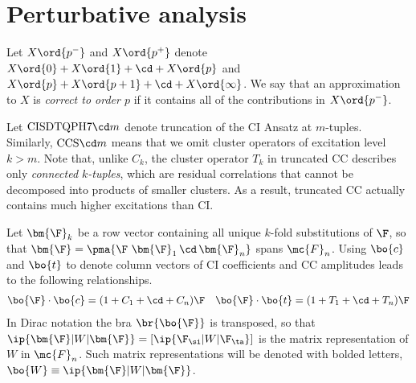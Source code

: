 \chapter{Perturbative analysis}


\begin{dfn}
Let
$
  X\ord{p^-}
$
and
$
  X\ord{p^+}
$
denote
$
  X\ord{0}
+
  X\ord{1}
+
  \cd
+
  X\ord{p}
$
and
$
  X\ord{p}
+
  X\ord{p+1}
+
  \cd
+
  X\ord{\infty}
$.
We say that an approximation to $X$ is \textit{correct to order $p$} if it contains all of the contributions in $X\ord{p^-}$.
\end{dfn}

\begin{dfn}
Let $\text{CISDTQPH7}{\cd}m$ denote truncation of the CI Ansatz at $m$-tuples.
Similarly, $\text{CCS}{\cd}m$ means that we omit cluster operators of excitation level $k>m$.
Note that, unlike $C_k$, the cluster operator $T_k$ in truncated CC describes only \textit{connected $k$-tuples}, which are residual correlations that cannot be decomposed into products of smaller clusters.
As a result, truncated CC actually contains much higher excitations than CI.
\end{dfn}

\begin{ntt}
Let
$\bm{\F}_k$
be a row vector containing all unique $k$-fold substitutions of $\F$,
so that $\bm{\F}=\pma{\F\ \bm{\F}_1\,\cd\,\bm{\F}_n}$ spans $\mc{F}_n$.
Using $\bo{c}$ and $\bo{t}$ to denote column vectors of CI coefficients and CC amplitudes leads to the following relationships.
\begin{align}
  \bo{\F}\cdot\bo{c}
=
  (1 + C_1+\cd +C_n)\F
&&
  \bo{\F}\cdot\bo{t}
=
  (1 + T_1+\cd +T_n)\F
\end{align}
In Dirac notation the bra $\br{\bo{\F}}$ is transposed, so that
$
  \ip{\bm{\F}|W|\bm{\F}}
=
  [\ip{\F_\si|W|\F_\ta}]
$
is the matrix representation of $W$ in $\mc{F}_n$.
Such matrix representations will be denoted with bolded letters,
$
  \bo{W}
\equiv
  \ip{\bm{\F}|W|\bm{\F}}
$.
\end{ntt}



